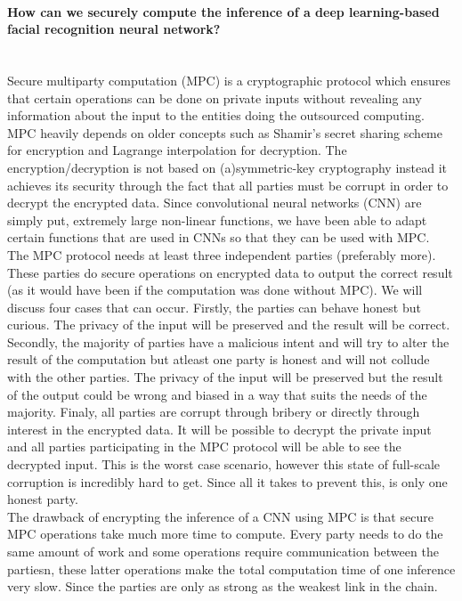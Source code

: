 \paragraph{How can we securely compute the inference of a deep learning-based facial recognition neural network?}\mbox{} \\
Secure multiparty computation (MPC) is a cryptographic protocol which ensures that certain operations can be done on private inputs without revealing any information about the input to the entities doing the outsourced computing. MPC heavily depends on older concepts such as Shamir's secret sharing scheme for encryption and Lagrange interpolation for decryption. The encryption/decryption is not based on (a)symmetric-key cryptography instead it achieves its security through the fact that all parties must be corrupt in order to decrypt the encrypted data. Since convolutional neural networks (CNN) are simply put, extremely large non-linear functions, we have been able to adapt certain functions that are used in CNNs so that they can be used with MPC.\\
The MPC protocol needs at least three independent parties (preferably more). These parties do secure operations on encrypted data to output the correct result (as it would have been if the computation was done without MPC). We will discuss four cases that can occur. Firstly, the parties can behave honest but curious. The privacy of the input will be preserved and the result will be correct. Secondly, the majority of parties have a malicious intent and will try to alter the result of the computation but atleast one party is honest and will not collude with the other parties. The privacy of the input will be preserved but the result of the output could be wrong and biased in a way that suits the needs of the majority. Finaly, all parties are corrupt through bribery or directly through interest in the encrypted data. It will be possible to decrypt the private input and all parties participating in the MPC protocol will be able to see the decrypted input. This is the worst case scenario, however this state of full-scale corruption is incredibly hard to get. Since all it takes to prevent this, is only one honest party.\\
The drawback of encrypting the inference of a CNN using MPC is that secure MPC operations take much more time to compute. Every party needs to do the same amount of work and some operations require communication between the partiesn, these latter operations make the total computation time of one inference very slow. Since the parties are only as strong as the weakest link in the chain.

